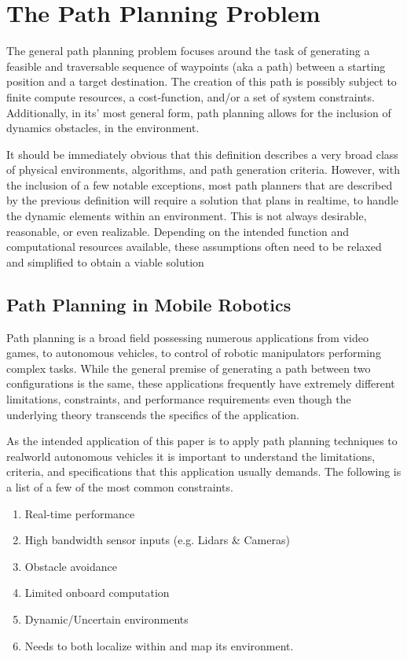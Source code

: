\section{The Path Planning Problem} 
The general path planning problem focuses around the task of generating a feasible and traversable sequence of waypoints (aka a path) between a starting position and a target destination. The creation of this path is possibly subject to finite compute resources, a cost-function, and/or a set of system constraints. Additionally, in its' most general form, path planning allows for the inclusion of dynamics obstacles, in the environment. 

It should be immediately obvious that this definition describes a very broad class of physical environments, algorithms, and path generation criteria. However, with the inclusion of a few notable exceptions, most path planners that are described by the previous definition will require a solution that plans in realtime, to handle the dynamic elements within an environment. This is not always desirable, reasonable, or even realizable. Depending on the intended function and computational resources available, these assumptions often need to be relaxed and simplified to obtain a viable solution

\subsection{Path Planning in Mobile Robotics}
Path planning is a broad field possessing numerous applications from video games, to autonomous vehicles, to control of robotic manipulators performing complex tasks. While the general premise of generating a path between two configurations is the same, these applications frequently have extremely different limitations, constraints, and performance requirements even though the underlying theory transcends the specifics of the application.

As the intended application of this paper is to apply path planning techniques to realworld autonomous vehicles it is important to understand the limitations, criteria, and specifications that this application usually demands. The following is a list of a few of the most common constraints.


\begin{enumerate}
    \item Real-time performance 
    \item High bandwidth sensor inputs (e.g. Lidars \& Cameras)
    \item Obstacle avoidance 
    \item Limited onboard computation
    \item Dynamic/Uncertain environments
    \item Needs to both localize within and map its environment.
\end{enumerate}


